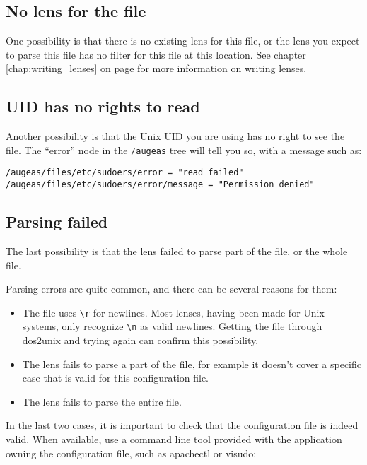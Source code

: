 \subsection{No lens for the file}

One possibility is that there is no existing lens for this file, or the lens you expect to parse this file has no filter for this file at this location. See chapter \ref{chap:writing_lenses} on page \pageref{chap:writing_lenses} for more information on writing lenses.

\subsection{UID has no rights to read}

Another possibility is that the Unix UID you are using has no right to see the file. The ``error'' node in the \nolinkurl{/augeas} tree will tell you so, with a message such as:


\begin{verbatim}
/augeas/files/etc/sudoers/error = "read_failed"
/augeas/files/etc/sudoers/error/message = "Permission denied"
\end{verbatim}

\subsection{Parsing failed}

The last possibility is that the lens failed to parse part of the file, or the whole file.

Parsing errors are quite common, and there can be several reasons for them:

\begin{itemize}
\item
  The file uses \verb!\r! for newlines. Most lenses, having been made for Unix systems, only recognize \verb!\n! as valid newlines. Getting the file through dos2unix and trying again can confirm this possibility.
\item
  The lens fails to parse a part of the file, for example it doesn't cover a specific case that is valid for this configuration file.
\item
  The lens fails to parse the entire file.
\end{itemize}
In the last two cases, it is important to check that the configuration file is indeed valid. When available, use a command line tool provided with the application owning the configuration file, such as apachectl or visudo:


